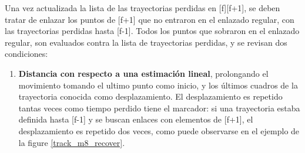 \begin{itemize}
Una vez actualizada la lista de las trayectorias perdidas en [f][f+1], se deben tratar de enlazar los puntos de [f+1] que no entraron en el enlazado regular, con las trayectorias perdidas hasta [f-1]. Todos los puntos que sobraron en el enlazado regular, son evaluados contra la lista de trayectorias perdidas, y se revisan dos condiciones:

\begin{enumerate}
  \item \textbf{Distancia con respecto a una estimación lineal}, prolongando el movimiento tomando el ultimo punto como inicio, y los últimos cuadros de la trayectoria conocida como desplazamiento. El desplazamiento es repetido tantas veces como tiempo perdido tiene el marcador: si una trayectoria estaba definida hasta [f-1] y se buscan enlaces con elementos de [f+1], el desplazamiento es repetido dos veces, como puede observarse en el ejemplo de la figure \ref{track_m8_recover}. 
 
\begin{figure}[H]
 \centering
  \hspace{3 mm}
	

\end{figure}
\end{enumerate}
\end{itemize}
